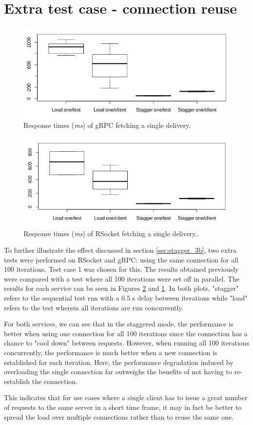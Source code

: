 \section{Extra test case - connection reuse}
\begin{figure}
    \centerline{\includegraphics[scale=0.6]{thesis_svava/images/grpcconnections.png}}
    \caption{Response times (\textit{ms}) of gRPC fetching a single delivery.}
    \label{fig:conn_reuse_g}
\end{figure}
\begin{figure}
    \centerline{\includegraphics[scale=0.6]{thesis_svava/images/rsocketconnections.png}}
    \caption{Response times (\textit{ms}) of RSocket fetching a single delivery..}
    \label{fig:conn_reuse_r}
\end{figure}
To further illustrate the effect discussed in section \ref{sec:stagger_3b}, two extra tests were performed on RSocket and gRPC: using the same connection for all 100 iterations. Test case 1 was chosen for this. The results obtained previously were compared with a test where all 100 iterations were set off in parallel. The results for each service can be seen in Figures \ref{fig:conn_reuse_r} and \ref{fig:conn_reuse_g}. In both plots, "stagger" refers to the sequential test run with a 0.5 s delay between iterations while "load" refers to the test wherein all iterations are run concurrently.

For both services, we can see that in the staggered mode, the performance is better when using one connection for all 100 iterations since the connection has a chance to "cool down" between requests. However, when running all 100 iterations concurrently, the performance is much better when a new connection is established for each iteration. Here, the performance degradation induced by overloading the single connection far outweighs the benefits of not having to re-establish the connection.

This indicates that for use cases where a single client has to issue a great number of requests to the same server in a short time frame, it may in fact be better to spread the load over multiple connections rather than to reuse the same one.